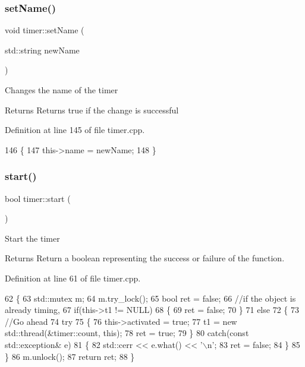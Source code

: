 \subsubsection{\texorpdfstring{set\+Name()}{setName()}}
{\footnotesize\ttfamily void timer\+::set\+Name (\begin{DoxyParamCaption}\item[{std\+::string}]{new\+Name }\end{DoxyParamCaption})}

Changes the name of the timer \begin{DoxyReturn}{Returns}
Returns true if the change is successful 
\end{DoxyReturn}


Definition at line 145 of file timer.\+cpp.


\begin{DoxyCode}
146 \{
147     this->name = newName;
148 \}
\end{DoxyCode}
\mbox{\label{classtimer_adad85b4705278d4cb8a2a4f3286cc2c7}} 
\subsubsection{\texorpdfstring{start()}{start()}}
{\footnotesize\ttfamily bool timer\+::start (\begin{DoxyParamCaption}{ }\end{DoxyParamCaption})}

Start the timer \begin{DoxyReturn}{Returns}
Return a boolean representing the success or failure of the function. 
\end{DoxyReturn}


Definition at line 61 of file timer.\+cpp.


\begin{DoxyCode}
62 \{
63     std::mutex m;
64     m.try\_lock();
65     \textcolor{keywordtype}{bool} ret = \textcolor{keyword}{false};
66     \textcolor{comment}{//if the object is already timing,}
67     \textcolor{keywordflow}{if}(this->t1 != NULL)
68     \{
69         ret = \textcolor{keyword}{false};
70     \}
71     \textcolor{keywordflow}{else}
72     \{
73         \textcolor{comment}{//Go ahead}
74         \textcolor{keywordflow}{try}
75         \{
76             this->activated = \textcolor{keyword}{true};
77             t1 = \textcolor{keyword}{new} std::thread(&timer::count, \textcolor{keyword}{this});
78             ret = \textcolor{keyword}{true};
79         \}
80         \textcolor{keywordflow}{catch}(\textcolor{keyword}{const} std::exception& e)
81         \{
82             std::cerr << e.what() << \textcolor{charliteral}{'\(\backslash\)n'};
83             ret = \textcolor{keyword}{false};
84         \}
85     \}
86     m.unlock();
87     \textcolor{keywordflow}{return} ret;
88 \}
\end{DoxyCode}
\mbox{\label{classtimer_ad21a0c9113d870f8485b775f1fcd3c73}} 
